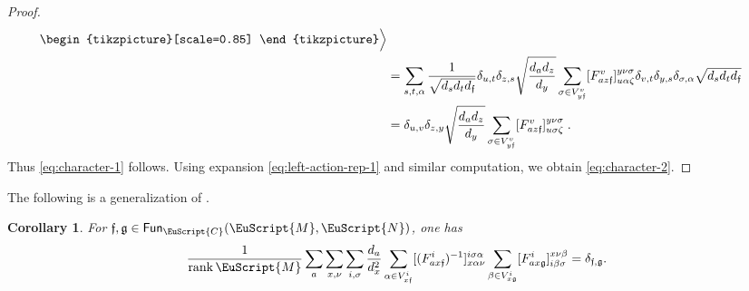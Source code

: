 \documentclass[a4paper,11pt]{article}
\newtheorem{corollary}[theorem]{Corollary}
\theoremstyle{definition}
\theoremstyle{remark}
\newcommand\eC           {\EuScript{C}}
\newcommand\eM          {\EuScript{M}}
\newcommand\eN         {\EuScript{N}}
\newcommand{\Fun}{\mathsf{Fun}}
\begin{document}
\begin{proof}
\begin{align}
\begin{aligned}
\begin{tikzpicture}[scale=0.85]
        \end{tikzpicture}
    \end{aligned}
    \Big{\rangle}  \nonumber \\
    & = \sum_{s,t,\alpha} \frac{1}{\sqrt{d_sd_td_\mathfrak{f}}} \delta_{u,t}\delta_{z,s} \sqrt{\frac{d_ad_z}{d_y}} \sum_{\sigma\in V_{y\mathfrak{f}}^v} [F_{az\mathfrak{f}}^v]_{u\alpha\zeta}^{y\nu\sigma} \delta_{v,t}\delta_{y,s}\delta_{\sigma,\alpha}\sqrt{d_sd_td_\mathfrak{f}} \nonumber \\
    & = \delta_{u,v}\delta_{z,y}\sqrt{\frac{d_ad_z}{d_y}}\sum_{\sigma\in V_{y\mathfrak{f}}^v} [F_{az\mathfrak{f}}^v]_{u\sigma\zeta}^{y\nu\sigma}\;.
    \end{align}  
    Thus \eqref{eq:character-1} follows. Using expansion \eqref{eq:left-action-rep-1} and similar computation, we obtain \eqref{eq:character-2}. 
\end{proof}

The following is a generalization of \cite[(19b)]{bridgeman2023invertible}.

\begin{corollary}
    For $\mathfrak{f},\mathfrak{g}\in \Fun_\eC(\eM,\eN)$, one has 
    \begin{equation}
        \frac{1}{\operatorname{rank}\eM}\sum_{a}\sum_{x,\nu} \sum_{i,\sigma} \frac{d_a}{d_x^2} \sum_{\alpha \in V_{x\mathfrak{f}}^i}  [(F_{ax\mathfrak{f}}^i)^{-1}]^{i\sigma\alpha}_{x\alpha\nu}\sum_{\beta\in V_{x\mathfrak{g}}^i} [F_{ax\mathfrak{g}}^i]_{i\beta\sigma}^{x\nu\beta} = \delta_{\mathfrak{f},\mathfrak{g}}. 
    \end{equation}
\end{corollary}
\end{document}
